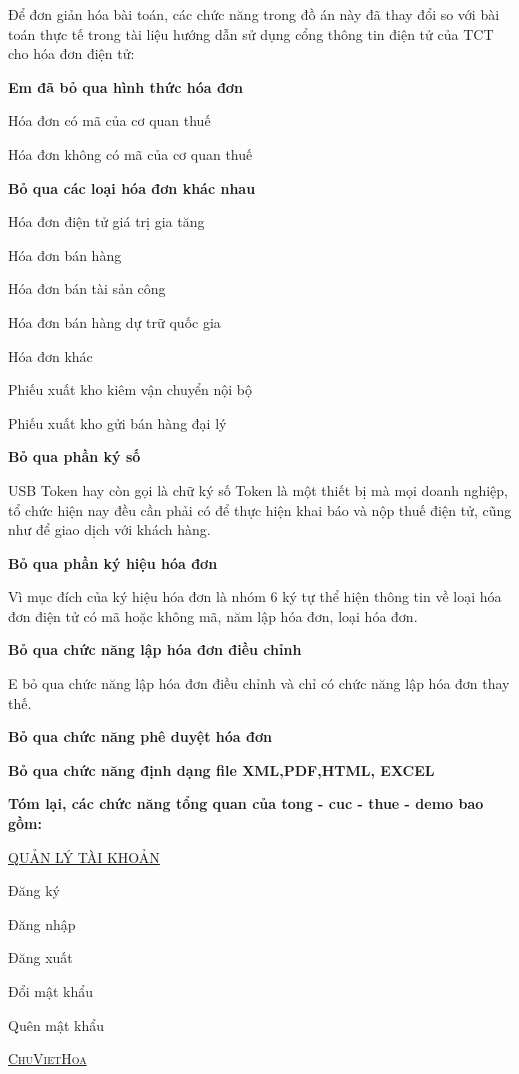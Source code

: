 Để đơn giản hóa bài toán, các chức năng trong đồ án này đã thay đổi so với bài toán thực tế trong tài liệu hướng dẫn sử dụng cổng thông tin điện tử của TCT cho hóa đơn điện tử:

\textbf{Em đã bỏ qua hình thức hóa đơn}

Hóa đơn có mã của cơ quan thuế

Hóa đơn không có mã của cơ quan thuế

\textbf{Bỏ qua các loại hóa đơn khác nhau}

Hóa đơn điện tử giá trị gia tăng

Hóa đơn bán hàng

Hóa đơn bán tài sản công

Hóa đơn bán hàng dự trữ quốc gia

Hóa đơn khác

Phiếu xuất kho kiêm vận chuyển nội bộ

Phiếu xuất kho gửi bán hàng đại lý

\textbf{Bỏ qua phần ký số}

USB Token hay còn gọi là chữ ký số Token là một thiết bị mà mọi doanh nghiệp, tổ chức hiện nay đều cần phải có để thực hiện khai báo và nộp thuế điện tử, cũng như để giao dịch với khách hàng.

\textbf{Bỏ qua phần ký hiệu hóa đơn}

Vì mục đích của ký hiệu hóa đơn là nhóm 6 ký tự thể hiện thông tin về loại hóa đơn điện tử có mã hoặc không mã, năm lập hóa đơn, loại hóa đơn.

\textbf{Bỏ qua chức năng lập hóa đơn điều chỉnh}

E bỏ qua chức năng lập hóa đơn điều chỉnh và chỉ có chức năng lập hóa đơn thay thế.

\textbf{Bỏ qua chức năng phê duyệt hóa đơn}

\textbf{Bỏ qua chức năng định dạng file XML,PDF,HTML, EXCEL}

\textbf{Tóm lại, các chức năng tổng quan của tong - cuc - thue - demo bao gồm:}

\underline{\textsc{ QUẢN LÝ TÀI KHOẢN}} 

Đăng ký  


Đăng nhập  

Đăng xuất  

Đổi mật khẩu

Quên mật khẩu 

\underline{\textsc{ChuVietHoa}}

